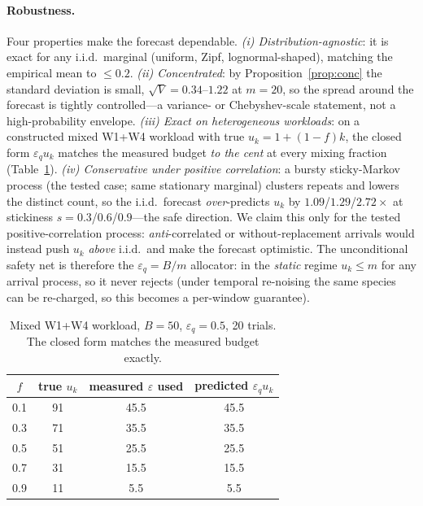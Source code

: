 \documentclass[sigconf,nonacm]{acmart}
\newcommand{\eps}{\varepsilon}
\begin{document}
\paragraph{Robustness.}
Four properties make the forecast dependable. \emph{(i) Distribution-agnostic}: it is exact for any i.i.d.\ marginal (uniform, Zipf, lognormal-shaped), matching the empirical mean to $\le0.2$. \emph{(ii) Concentrated}: by Proposition~\ref{prop:conc} the standard deviation is small, $\sqrt V{=}0.34$--$1.22$ at $m{=}20$, so the spread around the forecast is tightly controlled---a variance- or Chebyshev-scale statement, not a high-probability envelope. \emph{(iii) Exact on heterogeneous workloads}: on a constructed mixed W1+W4 workload with true $u_k=1+(1-f)k$, the closed form $\eps_q u_k$ matches the measured budget \emph{to the cent} at every mixing fraction (Table~\ref{tab:mixed}). \emph{(iv) Conservative under \emph{positive} correlation}: a bursty sticky-Markov process (the tested case; same stationary marginal) clusters repeats and lowers the distinct count, so the i.i.d.\ forecast \emph{over}-predicts $u_k$ by $1.09$/$1.29$/$2.72\times$ at stickiness $s{=}0.3$/$0.6$/$0.9$---the safe direction. We claim this only for the tested positive-correlation process: \emph{anti}-correlated or without-replacement arrivals would instead push $u_k$ \emph{above} i.i.d.\ and make the forecast optimistic. The unconditional safety net is therefore the $\eps_q{=}B/m$ allocator: in the \emph{static} regime $u_k\le m$ for any arrival process, so it never rejects (under temporal re-noising the same species can be re-charged, so this becomes a per-window guarantee).

\begin{table}[h]
\caption{Mixed W1+W4 workload, $B{=}50$, $\eps_q{=}0.5$, 20 trials. The closed form matches the measured budget exactly.}
\label{tab:mixed}
\centering\small
\begin{tabular}{c|c|cc}
\toprule
$f$ & true $u_k$ & measured $\eps$ used & predicted $\eps_q u_k$ \\
\midrule
0.1 & 91 & 45.5 & 45.5 \\
0.3 & 71 & 35.5 & 35.5 \\
0.5 & 51 & 25.5 & 25.5 \\
0.7 & 31 & 15.5 & 15.5 \\
0.9 & 11 & 5.5  & 5.5  \\
\bottomrule
\end{tabular}
\end{table}
\end{document}
